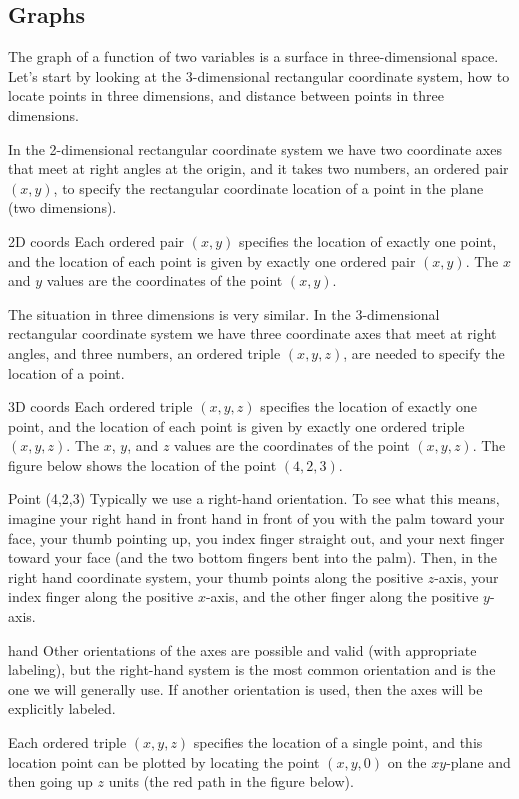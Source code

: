 \subsection{Graphs}
The graph of a function of two variables is a surface in three-dimensional space. Let's start by looking at the 3-dimensional rectangular coordinate system, how to locate points in three dimensions, and distance between points in three dimensions.

In the 2-dimensional rectangular coordinate system we have two coordinate axes that meet at right angles at the origin, and it takes two numbers, an ordered pair $(x,y)$, to specify the rectangular coordinate location of a point in the plane (two dimensions).

2D coords
Each ordered pair $(x,y)$ specifies the location of exactly one point, and the location of each point is given by exactly one ordered pair $(x,y)$. The $x$ and $y$ values are the coordinates of the point $(x,y)$.

The situation in three dimensions is very similar. In the 3-dimensional rectangular coordinate system we have three coordinate axes that meet at right angles, and three numbers, an ordered triple $(x,y,z)$, are needed to specify the location of a point.

3D coords
Each ordered triple $(x,y,z)$ specifies the location of exactly one point, and the location of each point is given by exactly one ordered triple $(x,y,z)$. The $x$, $y$, and $z$ values are the coordinates of the point $(x,y,z)$. The figure below shows the location of the point $(4, 2, 3)$.

Point (4,2,3)
Typically we use a right-hand orientation. To see what this means, imagine your right hand in front hand in front of you with the palm toward your face, your thumb pointing up, you index finger straight out, and your next finger toward your face (and the two bottom fingers bent into the palm). Then, in the right hand coordinate system, your thumb points along the positive $z$-axis, your index finger along the positive $x$-axis, and the other finger along the positive $y$-axis.

hand
Other orientations of the axes are possible and valid (with appropriate labeling), but the right-hand system is the most common orientation and is the one we will generally use. If another orientation is used, then the axes will be explicitly labeled.

Each ordered triple $(x,y,z)$ specifies the location of a single point, and this location point can be plotted by locating the point $(x,y,0)$ on the $xy$-plane and then going up $z$ units (the red path in the figure below).

